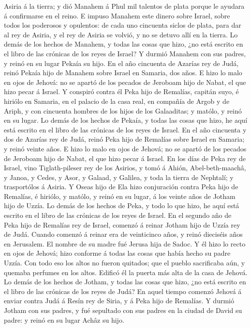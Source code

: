 Asiria á la tierra; y dió Manahem á Phul mil talentos de plata porque le
ayudara á confirmarse en el reino.  E impuso Manahem este
dinero sobre Israel, sobre todos los poderosos y opulentos: de cada uno
cincuenta siclos de plata, para dar al rey de Asiria, y el rey de Asiria
se volvió, y no se detuvo allí en la tierra.  Lo demás de
los hechos de Manahem, y todas las cosas que hizo, ¿no está escrito en
el libro de las crónicas de los reyes de Israel?  Y durmió
Manahem con sus padres, y reinó en su lugar Pekaía su hijo.
 En el año cincuenta de Azarías rey de Judá, reinó Pekaía
hijo de Manahem sobre Israel en Samaria, dos años.  E hizo
lo malo en ojos de Jehová: no se apartó de los pecados de Jeroboam hijo
de Nabat, el que hizo pecar á Israel.  Y conspiró contra él
Peka hijo de Remalías, capitán suyo, é hiriólo en Samaria, en el palacio
de la casa real, en compañía de Argob y de Ariph, y con cincuenta
hombres de los hijos de los Galaaditas; y matólo, y reinó en su lugar.
 Lo demás de los hechos de Pekaía, y todas las cosas que
hizo, he aquí está escrito en el libro de las crónicas de los reyes de
Israel.  En el año cincuenta y dos de Azarías rey de Judá,
reinó Peka hijo de Remalías sobre Israel en Samaria; y reinó veinte
años.  E hizo lo malo en ojos de Jehová; no se apartó de
los pecados de Jeroboam hijo de Nabat, el que hizo pecar á Israel.
 En los días de Peka rey de Israel, vino Tiglath-pileser
rey de los Asirios, y tomó á Ahión, Abel-beth-maachâ, y Janoa, y Cedes,
y Asor, y Galaad, y Galilea, y toda la tierra de Nephtalí; y
trasportólos á Asiria.  Y Oseas hijo de Ela hizo
conjuración contra Peka hijo de Remalías, é hiriólo, y matólo, y reinó
en su lugar, á los veinte años de Jotham hijo de Uzzía.  Lo
demás de los hechos de Peka, y todo lo que hizo, he aquí está escrito en
el libro de las crónicas de los reyes de Israel.  En el
segundo año de Peka hijo de Remalías rey de Israel, comenzó á reinar
Jotham hijo de Uzzía rey de Judá.  Cuando comenzó á reinar
era de veinticinco años, y reinó dieciséis años en Jerusalem. El nombre
de su madre fué Jerusa hija de Sadoc.  Y él hizo lo recto
en ojos de Jehová; hizo conforme á todas las cosas que había hecho su
padre Uzzía.  Con todo eso los altos no fueron quitados;
que el pueblo sacrificaba aún, y quemaba perfumes en los altos. Edificó
él la puerta más alta de la casa de Jehová.  Lo demás de
los hechos de Jotham, y todas las cosas que hizo, ¿no está escrito en el
libro de las crónicas de los reyes de Judá?  En aquel
tiempo comenzó Jehová á enviar contra Judá á Resín rey de Siria, y á
Peka hijo de Remalías.  Y durmió Jotham con sus padres, y
fué sepultado con sus padres en la ciudad de David su padre: y reinó en
su lugar Achâz su hijo.

